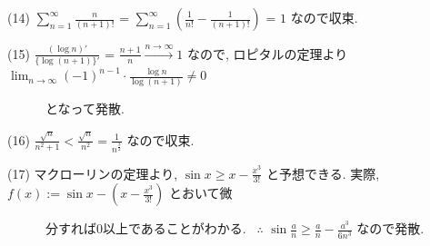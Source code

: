 \documentclass{jsarticle}
\begin{document}
(14) $\displaystyle \sum_{n=1}^{\infty} \frac{n}{(n+1)!}$ = 
     $\displaystyle \sum_{n=1}^{\infty} \left(\frac{1}{n!} - \frac{1}{(n+1)!} \right)$ = $1$
     なので収束.
     
(15) $\displaystyle \frac{(\log n)'}{\{\log{(n+1)}\}'}$ = 
     $\displaystyle \frac{n+1}{n} \stackrel{n \to \infty}{\longrightarrow} 1$ 
     なので, ロピタルの定理より
     $\displaystyle \lim_{n \to \infty} (-1)^{n-1} \cdot \frac{\log n}{\log{(n+1)}} \neq 0$
     
     \ \ \ \ \ \ となって発散.
     
(16) $\displaystyle \frac{\sqrt{n}}{n^2+1} < \frac{\sqrt{n}}{n^2} = \frac{1}{n^{\frac{3}{2}}}$
     なので収束.
     
(17) マクローリンの定理より, $\sin x \ge x - \displaystyle \frac{x^3}{3!}$ と予想できる. 実際, 
     $f(x) := \sin x - \left(x - \displaystyle \frac{x^3}{3!} \right)$ とおいて微
     
     \ \ \ \ \ \ 分すれば$0$以上であることがわかる. \ $\therefore$ 
     $\sin{\displaystyle \frac{a}{n}} \ge \displaystyle \frac{a}{n} - \frac{a^3}{6n^3}$ 
     なので発散. 
\end{document}
